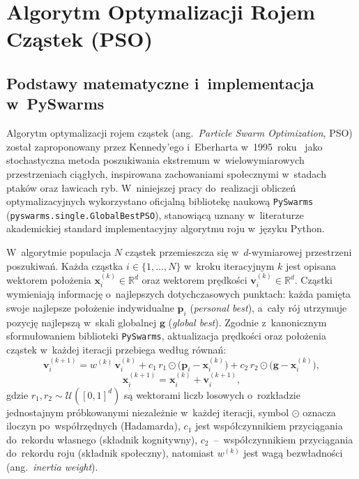 \section{Algorytm Optymalizacji Rojem Cząstek (PSO)}
\label{sec:pso}

\subsection{Podstawy matematyczne i~implementacja w~PySwarms}
\label{subsec:pso-math}

Algorytm optymalizacji rojem cząstek (ang.~\emph{Particle Swarm Optimization}, PSO) został zaproponowany przez Kennedy'ego i~Eberharta w~1995~roku~\cite{kennedy1995pso} jako stochastyczna metoda poszukiwania ekstremum w~wielowymiarowych przestrzeniach ciągłych, inspirowana zachowaniami społecznymi w~stadach ptaków oraz ławicach ryb. W~niniejszej pracy do~realizacji obliczeń optymalizacyjnych wykorzystano oficjalną bibliotekę naukową \texttt{PySwarms}~\cite{miranda2018pyswarms} (\texttt{pyswarms.single.GlobalBestPSO}), stanowiącą uznany w~literaturze akademickiej standard implementacyjny algorytmu roju w~języku Python.

W~algorytmie populacja $N$ cząstek przemieszcza się w~$d$-wymiarowej przestrzeni poszukiwań. Każda cząstka $i\in\{1,\dots,N\}$ w~kroku iteracyjnym $k$ jest opisana wektorem położenia $\mathbf{x}_i^{(k)}\in\mathbb{R}^d$ oraz wektorem prędkości $\mathbf{v}_i^{(k)}\in\mathbb{R}^d$. Cząstki wymieniają informację o~najlepszych dotychczasowych punktach: każda pamięta swoje najlepsze położenie indywidualne $\mathbf{p}_i$ (\emph{personal best}), a~cały rój utrzymuje pozycję najlepszą w~skali globalnej $\mathbf{g}$ (\emph{global best}). Zgodnie z~kanonicznym sformułowaniem biblioteki \texttt{PySwarms}, aktualizacja prędkości oraz położenia cząstek w~każdej iteracji przebiega według równań:
\begin{equation}
    \mathbf{v}_i^{(k+1)} = w^{(k)}\,\mathbf{v}_i^{(k)}
        + c_1\,r_1\odot\bigl(\mathbf{p}_i - \mathbf{x}_i^{(k)}\bigr)
        + c_2\,r_2\odot\bigl(\mathbf{g} - \mathbf{x}_i^{(k)}\bigr),
    \label{eq:pso-velocity}
\end{equation}
\begin{equation}
    \mathbf{x}_i^{(k+1)} = \mathbf{x}_i^{(k)} + \mathbf{v}_i^{(k+1)},
    \label{eq:pso-position}
\end{equation}
gdzie $r_1, r_2\sim\mathcal{U}([0,1]^d)$ są wektorami liczb losowych o~rozkładzie jednostajnym próbkowanymi niezależnie w~każdej iteracji, symbol $\odot$ oznacza iloczyn po~współrzędnych (Hadamarda), $c_1$ jest współczynnikiem przyciągania do~rekordu własnego (składnik kognitywny), $c_2$~--~współczynnikiem przyciągania do~rekordu roju (składnik społeczny), natomiast $w^{(k)}$ jest wagą bezwładności (ang.~\emph{inertia weight}).

